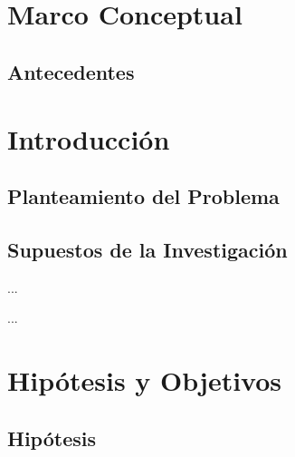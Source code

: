 \documentclass[12pt,a4paper]{config/myConfig}
\title{\Large $\ $\\ \bf } %
\author
\newcommand{\AssigmentNumber}{}%
\newcommand{\AssigmentDate}{} %
\begin{document}
\thispagestyle{myheadings}
\pagestyle{myheadings}
\markright{\tt \AssigmentNumber|    \AssigmentDate}%



\section{Marco Conceptual}
\label{sec:MARCO-CONCEPTUAL}

\subsection{Antecedentes}
\label{sec:ANTECEDENTES}

\section{Introducción}
\label{sec:INTRODUCCION}

\subsection{Planteamiento del Problema}
\label{sec:PLANTAMIENTO-PROBLEMA}

\subsection{Supuestos de la Investigación}
\label{sec:SUPUESTOS}

\begin{supuestos}
  \item \label{su:uno} ...
  \item \label{su:dos} ...
\end{supuestos}

\section{Hipótesis y Objetivos}
\label{sec:HIPOTESIS-OBJECTIVOS}

\subsection{Hipótesis}
\label{sec:HIPOTESIS}


\begin{hipotesis}
  {} %
  {} %
  {} %
  {} %
  {} %
\end{hipotesis}
\end{document}
